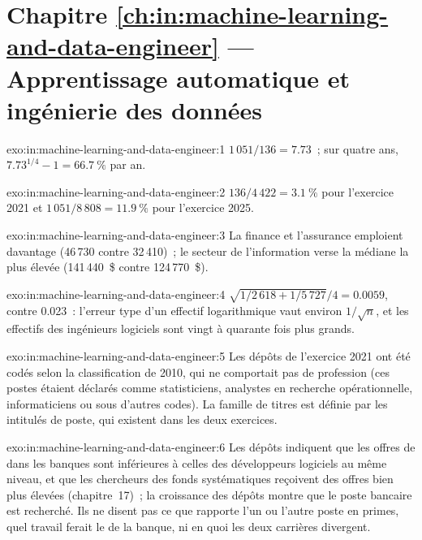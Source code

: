 \section*{Chapitre \ref{ch:in:machine-learning-and-data-engineer} --- Apprentissage automatique et ingénierie des données}

\begin{solution}{exo:in:machine-learning-and-data-engineer:1}
$1\,051/136=7.73$~; sur quatre ans, $7.73^{1/4}-1=66.7~\%$ par an.
\end{solution}

\begin{solution}{exo:in:machine-learning-and-data-engineer:2}
$136/4\,422=3.1~\%$ pour l'exercice 2021 et $1\,051/8\,808=11.9~\%$ pour l'exercice 2025.
\end{solution}

\begin{solution}{exo:in:machine-learning-and-data-engineer:3}
La finance et l'assurance emploient davantage (46\,730 contre 32\,410)~; le secteur de l'information verse la médiane
la plus élevée (141\,440~\$ contre 124\,770~\$).
\end{solution}

\begin{solution}{exo:in:machine-learning-and-data-engineer:4}
$\sqrt{1/2\,618+1/5\,727}/4=0.0059$, contre 0.023~: l'erreur type d'un effectif logarithmique vaut environ $1/\sqrt n$, et
les effectifs des ingénieurs logiciels sont vingt à quarante fois plus grands.
\end{solution}

\begin{solution}{exo:in:machine-learning-and-data-engineer:5}
Les dépôts de l'exercice 2021 ont été codés selon la classification de 2010, qui ne comportait pas de profession  (ces postes étaient déclarés
comme statisticiens, analystes en recherche opérationnelle, informaticiens ou sous d'autres codes). La famille de titres est définie par les
intitulés de poste, qui existent dans les deux exercices.
\end{solution}

\begin{solution}{exo:in:machine-learning-and-data-engineer:6}
Les dépôts indiquent que les offres de  dans les banques sont inférieures à celles des développeurs logiciels au même niveau, et que
les chercheurs des fonds systématiques reçoivent des offres bien plus élevées (chapitre~17)~; la croissance des dépôts montre que le poste bancaire est recherché. Ils
ne disent pas ce que rapporte l'un ou l'autre poste en primes, quel travail ferait le  de la banque, ni en quoi les deux carrières divergent.
\end{solution}

